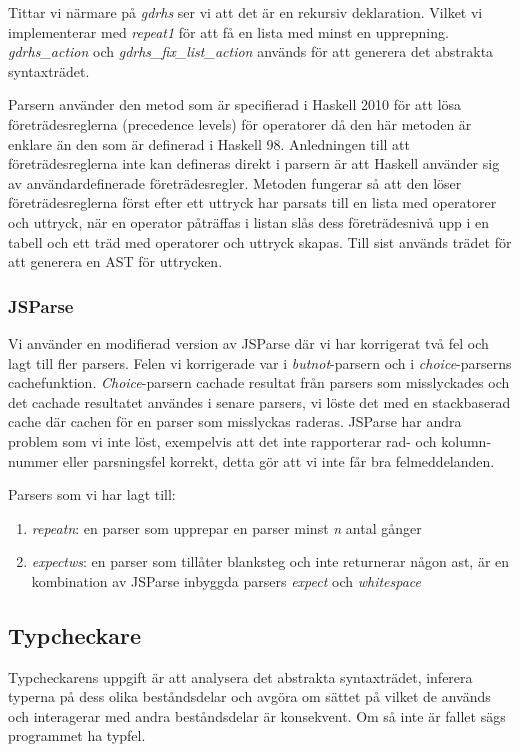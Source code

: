 Tittar vi närmare på \emph{gdrhs} ser vi att det är en rekursiv deklaration. Vilket vi implementerar med \emph{repeat1} för att få en lista med minst en upprepning. 
\emph{gdrhs\_action} och \emph{gdrhs\_fix\_list\_action} används för att generera det abstrakta syntaxträdet.

Parsern använder den metod som är specifierad i Haskell 2010 \citep{haskell2010} för att lösa företrädesreglerna (precedence levels) för operatorer då den här metoden är enklare än den som är definerad i Haskell 98. 
Anledningen till att företrädesreglerna inte kan defineras direkt i parsern är att Haskell använder sig av användardefinerade företrädesregler.
Metoden fungerar så att den löser företrädesreglerna först efter ett uttryck har parsats till en lista med operatorer 
och uttryck, när en operator påträffas i listan slås dess företrädesnivå upp i en tabell och ett träd med 
operatorer och uttryck skapas. Till sist används trädet för att generera en AST för uttrycken.

\subsubsection{JSParse}
Vi använder en modifierad version av JSParse där vi har korrigerat två fel och lagt till fler parsers. Felen vi korrigerade var i \emph{butnot}-parsern och i \emph{choice}-parserns cachefunktion. 
\emph{Choice}-parsern cachade resultat från parsers som misslyckades och det cachade resultatet användes i senare parsers, 
vi löste det med en stackbaserad cache där cachen för en parser som misslyckas raderas. 
JSParse har andra problem som vi inte löst, exempelvis att det inte rapporterar rad- och kolumn-nummer eller parsningsfel korrekt, detta gör att vi inte får bra felmeddelanden.

Parsers som vi har lagt till:
\begin{enumerate}
    \item{\emph{repeatn}: en parser som upprepar en parser minst \emph{n} antal gånger}
    \item{\emph{expectws}: en parser som tillåter blanksteg och inte returnerar någon ast, är en kombination av JSParse inbyggda parsers \emph{expect} och \emph{whitespace}}
\end{enumerate}

\subsection{Typcheckare} 
Typcheckarens uppgift är att analysera det abstrakta syntaxträdet, inferera typerna på dess olika
beståndsdelar och avgöra om sättet på vilket de används och interagerar med
andra beståndsdelar är konsekvent. Om så inte är fallet sägs programmet ha
typfel.

